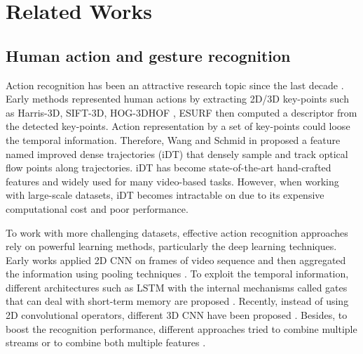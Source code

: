 
\section{Related Works} \label{sec:related_works}

    \subsection{Human action and gesture recognition}
        Action recognition has been an attractive research topic since the last decade \cite{zhang2019comprehensive}.
        Early methods represented human actions by extracting 2D/3D key-points such as Harris-3D, SIFT-3D, HOG-3DHOF \cite{laptev2008learning}, ESURF \cite{willems2008efficient} then computed a descriptor from the detected key-points.
        Action representation  by a set of key-points could loose the temporal information. Therefore, Wang and Schmid in \cite{wang2013action} proposed a feature named improved dense trajectories (iDT) that densely sample and track optical flow points along trajectories.
        iDT has become state-of-the-art hand-crafted features and widely used for many video-based tasks.
        However, when working with large-scale datasets, iDT becomes intractable on due to its expensive computational cost and poor performance. 

        To work with more challenging datasets, effective action recognition approaches rely on powerful learning methods, particularly the deep learning techniques.
        Early works applied 2D CNN on frames of video sequence and then aggregated the information using pooling techniques \cite{karpathy2014large}.
        To exploit the temporal information, different architectures such as LSTM with the internal mechanisms called gates that can deal with short-term memory are proposed \cite{sun2017lattice}.
        Recently, instead of using 2D convolutional operators, different 3D CNN have been proposed \cite{ji20123d, tran2015learning, varol2017long}.
        Besides, to boost the recognition performance, different approaches tried to combine multiple streams \cite{wang2015towards, feichtenhofer2016convolutional, khong2018improving} or to combine both multiple features \cite{wang2015action, christoph2016spatiotemporal}. %

